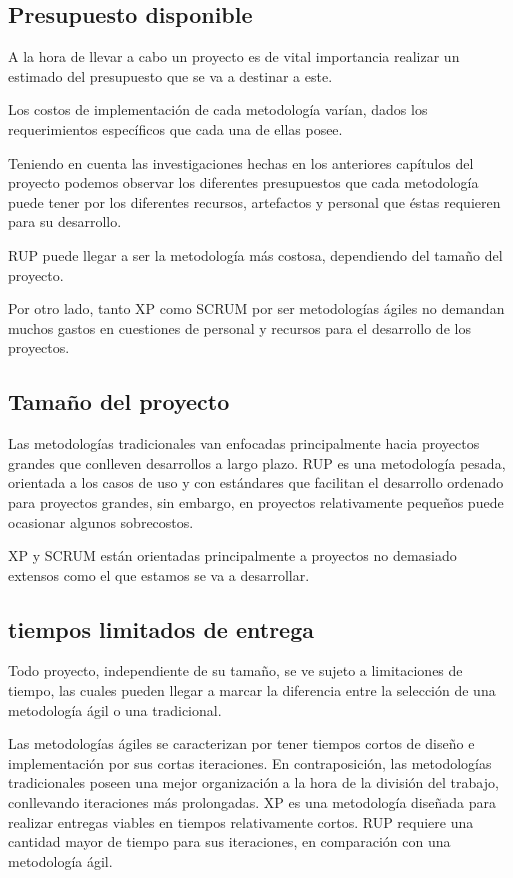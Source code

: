 \documentclass[12pt,a4paper]{article}
\newcommand{\espacio}{\par\vspace{3mm}}
\begin{document}
\subsection*{Presupuesto disponible}
A la hora de llevar a cabo un proyecto es de vital importancia realizar un estimado del presupuesto que se va a destinar a este.
\espacio Los costos de implementación de cada metodología varían, dados los requerimientos específicos que cada una de ellas posee.
\espacio Teniendo en cuenta las investigaciones hechas en los anteriores capítulos del proyecto podemos observar los diferentes presupuestos que cada metodología puede tener por los
diferentes recursos, artefactos y personal que éstas requieren para su desarrollo.
\espacio RUP puede llegar a ser la metodología más costosa, dependiendo del tamaño del proyecto.
\espacio Por otro lado, tanto XP como SCRUM por ser metodologías ágiles no demandan muchos gastos en cuestiones de personal y recursos para el desarrollo de los proyectos.

\subsection*{Tamaño del proyecto}
Las metodologías tradicionales van enfocadas principalmente hacia proyectos grandes que conlleven desarrollos a largo plazo. RUP es una metodología pesada, orientada a los casos de uso y con estándares que facilitan el desarrollo ordenado para proyectos grandes, sin embargo, en proyectos relativamente pequeños puede ocasionar algunos sobrecostos.
\espacio XP y SCRUM están orientadas principalmente a proyectos no demasiado extensos como el que estamos se va a desarrollar.

\subsection*{tiempos limitados de entrega}
Todo proyecto, independiente de su tamaño, se ve sujeto a limitaciones de tiempo, las cuales pueden llegar a marcar la diferencia entre la selección de una metodología ágil o una tradicional.
\espacio Las metodologías ágiles se caracterizan por tener tiempos cortos de diseño e
implementación por sus cortas iteraciones. En contraposición, las metodologías tradicionales poseen una mejor organización a la hora de la división del trabajo, conllevando iteraciones más prolongadas. XP es una metodología diseñada para realizar entregas viables en tiempos relativamente cortos. RUP requiere una cantidad mayor de tiempo para sus iteraciones, en comparación con una metodología ágil.
\end{document}

